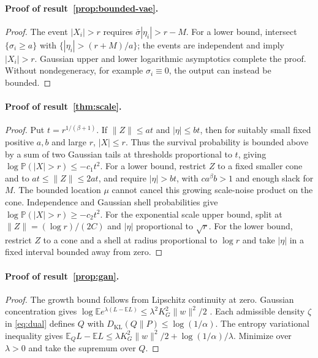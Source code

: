 \documentclass[11pt]{article}
\theoremstyle{definition}\newtheorem{definition}[theorem]{Definition}
\theoremstyle{remark}\newtheorem{remark}[theorem]{Remark}
\newcommand{\E}{\mathbb E}\newcommand{\Prob}{\mathbb P}\newcommand{\R}{\mathbb R}
\newcommand{\KL}{D_{\mathrm{KL}}}\newcommand{\ES}{\operatorname{ES}}\newcommand{\VaR}{\operatorname{VaR}}
\begin{document}
\paragraph{Proof of result~\ref{prop:bounded-vae}.}
\begin{proof}
The event $|X_i|>r$ requires $\bar\sigma|\eta_i|>r-M$. For a lower bound, intersect $\{\sigma_i\ge a\}$ with $\{|\eta_i|>(r+M)/a\}$; the events are independent and imply $|X_i|>r$. Gaussian upper and lower logarithmic asymptotics complete the proof. Without nondegeneracy, for example $\sigma_i\equiv0$, the output can instead be bounded.
\end{proof}

\paragraph{Proof of result~\ref{thm:scale}.}
\begin{proof}
Put $t=r^{1/(\beta+1)}$. If $\|Z\|\le at$ and $|\eta|\le bt$, then for suitably small fixed positive $a,b$ and large $r$, $|X|\le r$. Thus the survival probability is bounded above by a sum of two Gaussian tails at thresholds proportional to $t$, giving $\log\Prob(|X|>r)\le-c_1t^2$. For a lower bound, restrict $Z$ to a fixed smaller cone and to $at\le\|Z\|\le2at$, and require $|\eta|>bt$, with $ca^\beta b>1$ and enough slack for $M$. The bounded location $\mu$ cannot cancel this growing scale-noise product on the cone. Independence and Gaussian shell probabilities give $\log\Prob(|X|>r)\ge-c_2t^2$. For the exponential scale upper bound, split at $\|Z\|=(\log r)/(2C)$ and $|\eta|$ proportional to $\sqrt r$. For the lower bound, restrict $Z$ to a cone and a shell at radius proportional to $\log r$ and take $|\eta|$ in a fixed interval bounded away from zero.
\end{proof}

\paragraph{Proof of result~\ref{prop:gan}.}
\begin{proof}
The growth bound follows from Lipschitz continuity at zero. Gaussian concentration gives
$\log\E e^{\lambda(L-\E L)}\le\lambda^2K_G^2\|w\|^2/2$ \citep{boucheron2013}. Each admissible density $\zeta$ in \eqref{eq:dual} defines $Q$ with $\KL(Q\|P)\le\log(1/\alpha)$. The entropy variational inequality gives
$\E_Q L-\E L\le\lambda K_G^2\|w\|^2/2+\log(1/\alpha)/\lambda$.
Minimize over $\lambda>0$ and take the supremum over $Q$.
\end{proof}
\end{document}
